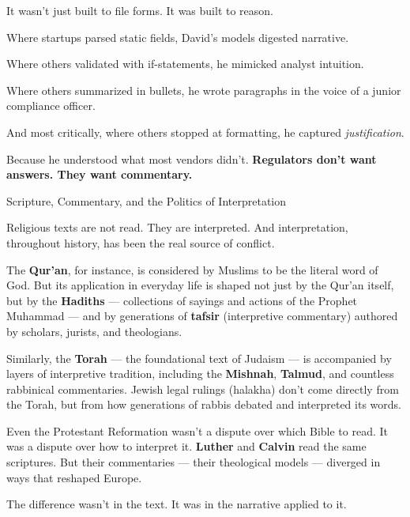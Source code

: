 It wasn’t just built to file forms. 
It was built to reason.

Where startups parsed static fields, David’s models digested narrative.

Where others validated with if-statements, he mimicked analyst intuition.

Where others summarized in bullets, he wrote paragraphs in the voice of a junior compliance officer.

And most critically, where others stopped at formatting, he captured \textit{justification}.

Because he understood what most vendors didn’t.
\textbf{Regulators don’t want answers. They want commentary.}

\medskip

\begin{HistoricalSidebar}{Scripture, Commentary, and the Politics of Interpretation}

    Religious texts are not read. They are interpreted.
    And interpretation, throughout history, has been the real source of conflict.
    
    \medskip
    
    The \textbf{Qur’an}, for instance, is considered by Muslims to be the literal word of God. But its 
    application in everyday life is shaped not just by the Qur’an itself, but by the \textbf{Hadiths} --- 
    collections of sayings and actions of the Prophet Muhammad --- and by generations of \textbf{tafsir} 
    (interpretive commentary) authored by scholars, jurists, and theologians.
    
    \medskip
    
    Similarly, the \textbf{Torah} — the foundational text of Judaism — is accompanied by layers of 
    interpretive tradition, including the \textbf{Mishnah}, \textbf{Talmud}, and countless rabbinical commentaries. 
    Jewish legal rulings (halakha) don’t come directly from the Torah, but from how generations of rabbis 
    debated and interpreted its words.
    
    \medskip
    
    Even the Protestant Reformation wasn’t a dispute over which Bible to read. It was a dispute over how to 
    interpret it. \textbf{Luther} and \textbf{Calvin} read the same scriptures. But their commentaries ---
    their theological models --- diverged in ways that reshaped Europe.  

    \medskip
    
    The difference wasn’t in the text. It was in the narrative applied to it.
    

\end{HistoricalSidebar}
